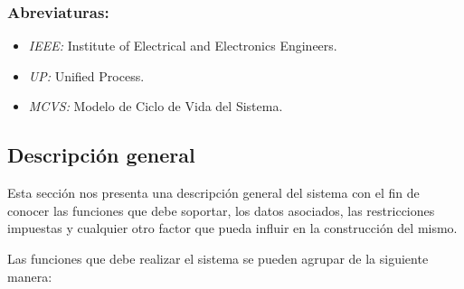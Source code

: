         \subsubsection{Abreviaturas:}

        \begin{itemize}

        \item \emph{IEEE:} Institute of Electrical and Electronics Engineers.
 
        \item \emph{UP:} Unified Process.

        \item \emph{MCVS:} Modelo de Ciclo de Vida del Sistema.

         \end{itemize}
    

 \subsection{Descripción general}

    Esta sección nos presenta una descripción general del sistema con el fin de conocer las funciones que debe soportar, los datos asociados, las restricciones impuestas y cualquier otro factor que pueda influir en la construcción del mismo.

Las funciones que debe realizar el sistema se pueden agrupar de la siguiente manera:

